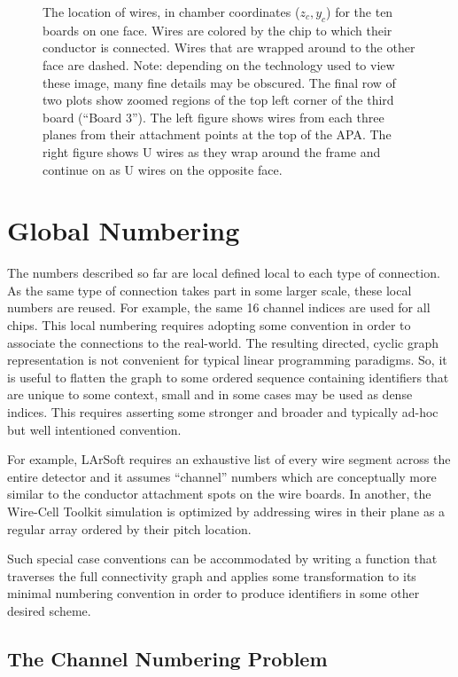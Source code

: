 \documentclass[pdftex,12pt,letter]{article}
\begin{document}
\begin{figure}[h]
  \caption{The location of wires, in chamber coordinates ($z_c,y_c$)
    for the ten boards on one face.  Wires are colored by the chip to
    which their conductor is connected.  Wires that are wrapped around
    to the other face are dashed.  Note: depending on the technology
    used to view these image, many fine details may be obscured.  The
    final row of two plots show zoomed regions of the top left corner
    of the third board (``Board 3'').  The left figure shows wires
    from each three planes from their attachment points at the top of
    the APA.  The right figure shows U wires as they wrap around the
    frame and continue on as U wires on the opposite face.}
  \label{fig:board}
\end{figure}


\section{Global Numbering}

The numbers described so far are local defined local to each type of
connection.  As the same type of connection takes part in some larger
scale, these local numbers are reused.  For example, the same 16
channel indices are used for all chips.  This local numbering requires
adopting some convention in order to associate the connections to the
real-world.  The resulting directed, cyclic graph representation is
not convenient for typical linear programming paradigms.  So, it is
useful to flatten the graph to some ordered sequence containing
identifiers that are unique to some context, small and in some cases
may be used as dense indices.  This requires asserting some stronger
and broader and typically ad-hoc but well intentioned convention.

For example, LArSoft requires an exhaustive list of every wire segment
across the entire detector and it assumes ``channel'' numbers which
are conceptually more similar to the conductor attachment spots on the
wire boards.  In another, the Wire-Cell Toolkit simulation is
optimized by addressing wires in their plane as a regular array
ordered by their pitch location.

Such special case conventions can be accommodated by writing a
function that traverses the full connectivity graph and applies some
transformation to its minimal numbering convention in order to produce
identifiers in some other desired scheme.

\subsection{The Channel Numbering Problem}
\end{document}

